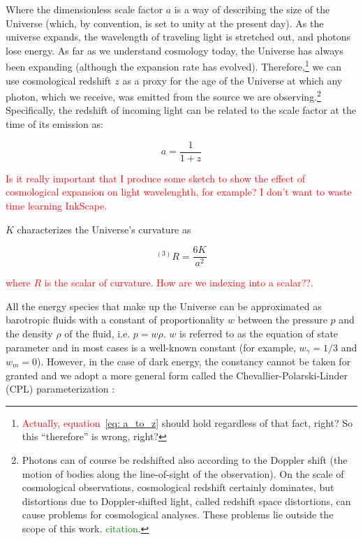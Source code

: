 Where the dimensionless scale factor $a$ is a way of describing the size of
the Universe (which, by convention, is set to unity at the present day). As 
the universe expands, the wavelength of traveling light is stretched out, and
photons lose energy. As far as we understand cosmology today, the Universe has
always been expanding (although the expansion rate has evolved).
Therefore,\footnote{\textcolor{red}{Actually, equation~\ref{eq: a_to_z}}
should hold regardless of that fact, right? So this ``therefore'' is wrong,
right?} we
can use cosmological redshift $z$ as a proxy for the age of the Universe at 
which any photon, which we receive, was emitted from the source we are 
observing.\footnote{Photons can of course be redshifted also according to the
Doppler shift (the motion of bodies along the line-of-sight of the 
observation). On the scale of cosmological observations, cosmological redshift
certainly dominates, but distortions due to Doppler-shifted light,
called redshift space distortions, can cause problems for cosmological 
analyses. These problems lie outside the scope of this work.
\textcolor{green}{citation}.} Specifically, the redshift of incoming light can
be related to the scale factor at the time of its emission as:

\begin{equation}
\label{eq: a_to_z}
a = \frac{1}{1 + z}
\end{equation}

\textcolor{red}{Is it really important that I produce some sketch to show the
effect of cosmological expansion on light wavelenghth, for example? I don't
want to waste time learning InkScape.}

$K$ characterizes the Universe's curvature as

\begin{equation}
^{(3)}R = \frac{6K}{a^2}
\end{equation}

\textcolor{red}{where $R$ is the scalar of curvature. How are we indexing
into a scalar??.}

All the energy species that make up the Universe can be approximated as
barotropic fluids with a constant of proportionality $w$ between the
pressure $p$ and the density $\rho$ of the fluid, i.e. $p = w \rho$. $w$ is
referred to as the equation of state parameter and in most cases is a
well-known constant (for example, $w_\gamma = 1/3$ and $w_m = 0$). However, in
the case of dark energy, the constancy cannot be taken for granted and we
adopt a more general form called the Chevallier-Polarski-Linder (CPL) 
parameterization :

